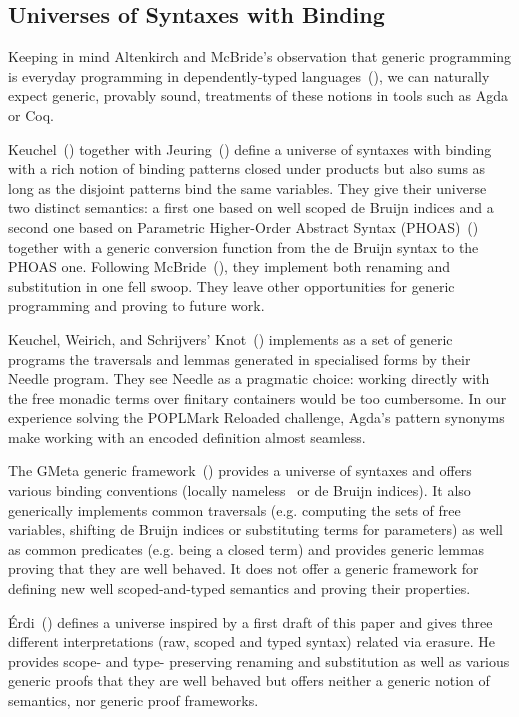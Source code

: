 \subsection{Universes of Syntaxes with Binding} Keeping in mind Altenkirch
and McBride's observation that generic programming is everyday programming
in dependently-typed languages~(\citeyear{DBLP:conf/ifip2-1/AltenkirchM02}),
we can naturally
expect generic, provably sound, treatments of these notions in tools such as
Agda or Coq.

Keuchel~(\citeyear{Keuchel:Thesis:2011}) together with
Jeuring~(\citeyear{DBLP:conf/icfp/KeuchelJ12})
define a universe of syntaxes with binding with a rich notion of binding
patterns closed under products but also sums as long as the disjoint
patterns bind the same variables.
%
They give their universe two distinct semantics: a first one based on well
scoped de Bruijn indices and a second one based on Parametric Higher-Order
Abstract Syntax (PHOAS)~(\cite{DBLP:conf/icfp/Chlipala08}) together with
a generic conversion function from the de Bruijn syntax to the PHOAS one.
%
Following McBride~(\citeyear{mcbride2005type}), they implement both renaming
and substitution in one fell swoop. They leave other
opportunities for generic programming and proving to future work.

Keuchel, Weirich, and Schrijvers' Knot~(\citeyear{needleandknot}) implements
as a set of generic programs the traversals and lemmas generated in specialised
forms by their Needle program. They see Needle as a pragmatic choice: working
directly with the free monadic terms over finitary containers would be too
cumbersome. In
our experience solving the POPLMark Reloaded challenge, Agda's pattern
synonyms make working with an encoded definition almost
seamless.

The GMeta generic framework~(\citeyear{gmeta}) provides a universe of syntaxes
and offers various binding conventions (locally nameless~\cite{Chargueraud2012}
or de Bruijn indices).
%
It also generically implements common traversals (e.g. computing
the sets of free variables,
shifting
de Bruijn indices or substituting terms for parameters) as well as common
predicates (e.g. being a closed term) and provides generic lemmas proving that
they are well behaved. It does not offer a generic framework
for defining new well scoped-and-typed semantics and proving their properties.

Érdi~(\citeyear{gergodraft}) defines a universe inspired by a first draft of
this paper and gives three different interpretations (raw, scoped and
typed syntax) related via erasure.
%
He provides scope- and type- preserving renaming and
substitution as well as various generic proofs that they are well behaved but
offers neither a generic notion of semantics, nor generic proof frameworks.

